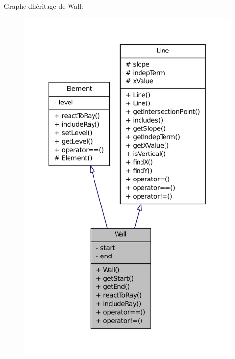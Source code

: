 Graphe d\textquotesingle{}héritage de Wall\+:\nopagebreak
\begin{figure}[H]
\begin{center}
\leavevmode
\includegraphics[width=320pt]{de/d28/classWall__inherit__graph}
\end{center}
\end{figure}


